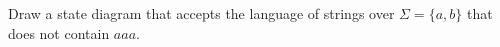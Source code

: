 Draw a state diagram that accepts the language of strings over $\Sigma
 = \{a, b\}$ that does not contain $aaa$.
